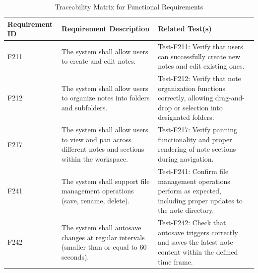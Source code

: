 \documentclass[12pt, titlepage]{article}
\begin{document}
\begin{table}[H]
\centering
\caption{Traceability Matrix for Functional Requirements}
\begin{tabular}{|p{2.5cm}|p{6cm}|p{6cm}|}
\hline
\textbf{Requirement ID} & \textbf{Requirement Description} & \textbf{Related Test(s)} \\
\hline
F211 & The system shall allow users to create and edit notes. & Test-F211: Verify that users can successfully create new notes and edit existing ones. \\
\hline
F212 & The system shall allow users to organize notes into folders and subfolders. & Test-F212: Verify that note organization functions correctly, allowing drag-and-drop or selection into designated folders. \\
\hline
F217 & The system shall allow users to view and pan across different notes and sections within the workspace. & Test-F217: Verify panning functionality and proper rendering of note sections during navigation. \\
\hline
F241 & The system shall support file management operations (save, rename, delete). & Test-F241: Confirm file management operations perform as expected, including proper updates to the note directory. \\
\hline
F242 & The system shall autosave changes at regular intervals (smaller than or equal to 60 seconds). & Test-F242: Check that autosave triggers correctly and saves the latest note content within the defined time frame. \\
\hline
\end{tabular}
\end{table}
\end{document}
